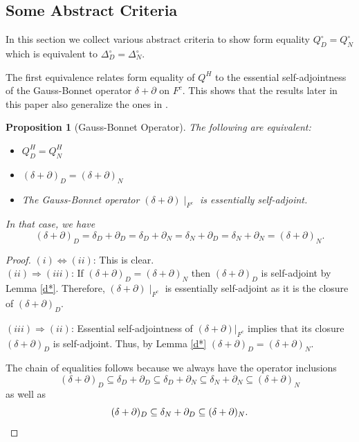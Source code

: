 \documentclass[10pt]{amsart}
\newtheorem{proposition}[theorem]{Proposition}
\theoremstyle{definition}
\newcommand{\F}{{F}}
\renewcommand{\bullet}{{\circ}}
\begin{document}
\subsection{Some Abstract Criteria}

In this section we collect various abstract criteria to show form equality $Q^{\bullet}_{D}=Q^{\bullet}_{N}$ which is equivalent to $\Delta^{\bullet}_{D}=\Delta^{\bullet}_{N}$. 

The first equivalence relates form equality of $Q^{H}$ to the essential self-adjointness of the Gauss-Bonnet operator $\delta+\partial$ on $F^{c}$. This shows that the results later in this paper also generalize the ones in \cite{ATH}.



\begin{proposition}[Gauss-Bonnet Operator]\label{d+del}
	The following are equivalent:
	\begin{itemize}
		\item[(i)] $Q^H_{D} = Q^H_N$
		\item[(ii)] $(\delta+\partial)_D = (\delta+\partial)_N$
		\item[(ii)] The Gauss-Bonnet operator $(\delta+\partial)\mid_{\F^c}$ is essentially self-adjoint.
	\end{itemize}
	In that case, we have $$(\delta+\partial)_D = \delta_D+\partial_D = \delta_D+\partial_N =\delta_N+\partial_D =\delta_N+\partial_N =(\delta+\partial)_N.$$
	
\end{proposition}
\begin{proof}
	$(i) \Leftrightarrow (ii)$: This is clear.\\
	$(ii) \Rightarrow (iii)$:
	If $(\delta+\partial)_D = (\delta+\partial)_N$ then $(\delta+\partial)_D$ is self-adjoint by Lemma \ref{d*}. Therefore, $(\delta+\partial)\mid_{\F^c}$ is essentially self-adjoint as it is the closure of $(\delta+\partial)_D$.
	
	
	$(iii) \Rightarrow (ii)$: Essential self-adjointness of $(\delta+\partial)\vert_{\F^c}$ implies that its closure $(\delta+\partial)_D$ is self-adjoint. Thus, by Lemma \ref{d*} $(\delta+\partial)_D = (\delta+\partial)_N.$ 
	
	The chain of equalities follows because we always have the operator inclusions
	$$(\delta+\partial)_D \subseteq \delta_D+\partial_D \subseteq \delta_D+\partial_N \subseteq \delta_N+\partial_N \subseteq(\delta+\partial)_N$$ as well as 
	\begin{equation*}
		(\delta+\partial)_D\subseteq \delta_N+\partial_D\subseteq(\delta+\partial)_N.\hfill\qedhere
	\end{equation*}
\end{proof}
\end{document}

